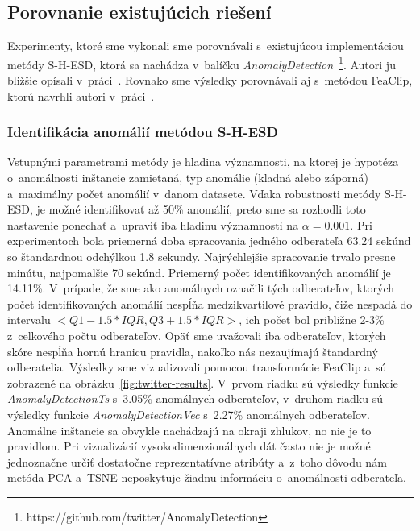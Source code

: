 \documentclass[a4paper,twoside,slovak,12pt,appendix]{article}
\begin{document}
\subsection{Porovnanie existujúcich riešení}
Experimenty, ktoré sme vykonali sme porovnávali s~existujúcou implementáciou
metódy S-H-ESD, ktorá sa nachádza v~balíčku
\textit{AnomalyDetection}~\footnote{https://github.com/twitter/AnomalyDetection}.
Autori ju bližšie opísali v~práci~\cite{Hochenbaum2014}. Rovnako sme výsledky
porovnávali aj s~metódou FeaClip, ktorú navrhli autori
v~práci~\cite{Laurinec2018}.

\subsubsection{Identifikácia anomálií metódou S-H-ESD}
Vstupnými parametrami metódy je hladina významnosti, na ktorej je hypotéza
o~anomálnosti inštancie zamietaná, typ anomálie (kladná alebo záporná)
a~maximálny počet anomálií v~danom datasete. Vďaka robustnosti metódy S-H-ESD,
je možné identifikovať až 50\% anomálií, preto sme sa rozhodli toto nastavenie
ponechať a~upraviť iba hladinu významnosti na $\alpha = 0.001$. Pri
experimentoch bola priemerná doba spracovania jedného odberateľa 63.24 sekúnd so
štandardnou odchýlkou 1.8 sekundy. Najrýchlejšie spracovanie trvalo presne
minútu, najpomalšie 70 sekúnd. Priemerný počet identifikovaných anomálií je
14.11\%. V~prípade, že sme ako anomálnych označili tých odberateľov, ktorých
počet identifikovaných anomálií nespĺňa medzikvartilové pravidlo, čiže nespadá
do intervalu $<Q1 - 1.5 * IQR, Q3 + 1.5 * IQR>$, ich počet bol približne 2-3\%
z~celkového počtu odberateľov. Opäť sme uvažovali iba odberateľov, ktorých skóre
nespĺňa hornú hranicu pravidla, nakoľko nás nezaujímajú štandardný odberatelia.
Výsledky sme vizualizovali pomocou transformácie FeaClip a~sú zobrazené na
obrázku~\ref{fig:twitter-results}. V~prvom riadku sú výsledky funkcie
\textit{AnomalyDetectionTs} s~3.05\% anomálnych odberateľov, v~druhom riadku sú
výsledky funkcie \textit{AnomalyDetectionVec} s~2.27\% anomálnych odberateľov.
Anomálne inštancie sa obvykle nachádzajú na okraji zhlukov, no nie je to
pravidlom. Pri vizualizácií vysokodimenzionálnych dát často nie je možné
jednoznačne určiť dostatočne reprezentatívne atribúty a~z~toho dôvodu nám metóda
PCA a~TSNE neposkytuje žiadnu informáciu o~anomálnosti odberateľa.
\end{document}
